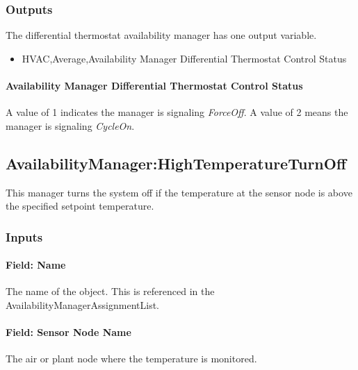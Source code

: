 \subsubsection{Outputs}\label{outputs-3-020}

The differential thermostat availability manager has one output variable.

\begin{itemize}
\tightlist
\item
  HVAC,Average,Availability Manager Differential Thermostat Control Status
\end{itemize}

\paragraph{Availability Manager Differential Thermostat Control Status}\label{availability-manager-differential-thermostat-control-status}

A value of 1 indicates the manager is signaling \emph{ForceOff}. A value of 2 means the manager is signaling \emph{CycleOn}.

\subsection{AvailabilityManager:HighTemperatureTurnOff}\label{availabilitymanagerhightemperatureturnoff}

This manager turns the system off if the temperature at the sensor node is above the specified setpoint temperature.

\subsubsection{Inputs}\label{inputs-5-031}

\paragraph{Field: Name}\label{field-name-4-029}

The name of the object. This is referenced in the AvailabilityManagerAssignmentList.

\paragraph{Field: Sensor Node Name}\label{field-sensor-node-name-002}

The air or plant node where the temperature is monitored.

